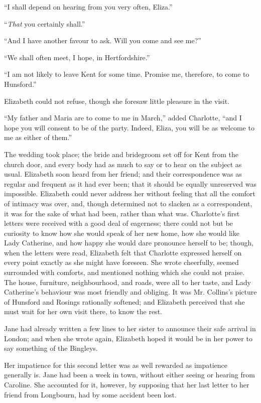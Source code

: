 “I shall depend on hearing from you very often,
Eliza.”

“\textit{That} you certainly shall.”

“And I have another favour to ask. Will you come
and see me?”

“We shall often meet, I hope, in Hertfordshire.”

“I am not likely to leave Kent for some time. Promise
me, therefore, to come to Hunsford.”

Elizabeth could not refuse, though she foresaw little
pleasure in the visit.

“My father and Maria are to come to me in March,”
added Charlotte, “and I hope you will consent to be of
the party. Indeed, Eliza, you will be as welcome to me
as either of them.”

The wedding took place; the bride and bridegroom set
off for Kent from the church door, and every body had
as much to say or to hear on the subject as usual. Elizabeth
soon heard from her friend; and their correspondence
was as regular and frequent as it had ever been;
that it should be equally unreserved was impossible.
Elizabeth could never address her without feeling that
all the comfort of intimacy was over, and, though
determined not to slacken as a correspondent, it was for
the sake of what had been, rather than what was. Charlotte’s
first letters were received with a good deal of
eagerness; there could not but be curiosity to know how
she would speak of her new home, how she would like
Lady Catherine, and how happy she would dare pronounce
herself to be; though, when the letters were read, Elizabeth
felt that Charlotte expressed herself on every point
exactly as she might have foreseen. She wrote cheerfully,
seemed surrounded with comforts, and mentioned nothing
which she could not praise. The house, furniture, neighbourhood,
and roads, were all to her taste, and Lady
Catherine’s behaviour was most friendly and obliging.
It was Mr. Collins’s picture of Hunsford and Rosings
rationally softened; and Elizabeth perceived that she
must wait for her own visit there, to know the rest.

Jane had already written a few lines to her sister to
announce their safe arrival in London; and when she
wrote again, Elizabeth hoped it would be in her power
to say something of the Bingleys.

Her impatience for this second letter was as well
rewarded as impatience generally is. Jane had been a week
in town, without either seeing or hearing from Caroline.
She accounted for it, however, by supposing that her last
letter to her friend from Longbourn, had by some accident
been lost.

